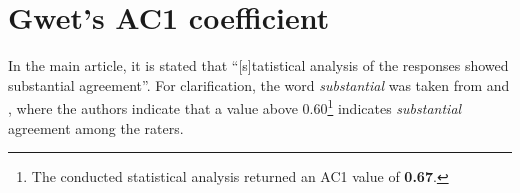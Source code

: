 \documentclass[12pt]{article}
\begin{document}
	\section{Gwet's AC1 coefficient}
	In the main article, it is stated that ``[s]tatistical analysis of the responses showed substantial agreement''. For clarification, the word \textit{substantial} was taken from \cite{Landis_Koch-1977} and \cite{Wongpakaran-2013}, where the authors indicate that a value above 0.60\footnote{The conducted statistical analysis returned an AC1 \cite{Gwet-2008} value of \textbf{0.67}.} indicates \textit{substantial} agreement among the raters.
	
	\clearpage %
	
	
	
	
\end{document}
